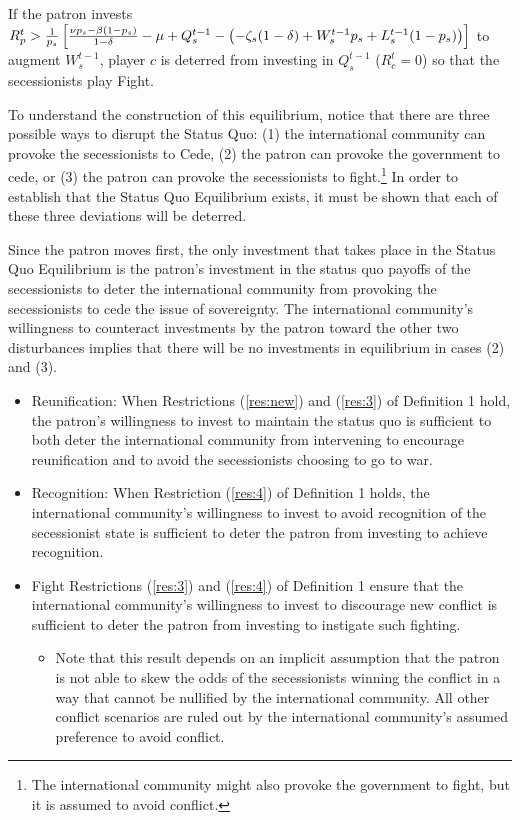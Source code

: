 \begin{definition}
\begin{enumerate}
If the patron invests $R_p^t > \frac{1}{p_s}\left[\frac{\nu p_s - \beta (1-p_s)}{1 -\delta} - \mu + Q_s^{t-1} - \left(-\zeta_{s}(1-\delta) + W_s^{t-1}p_s + L_s^{t-1}(1-p_s)\right)\right] $ to augment $W_s^{t-1}$, player $c$ is deterred from investing in $Q_s^{t-1}$ ($R_c^t=0$) so that the secessionists play Fight.
\end{enumerate}
\end{definition}

To understand the construction of this equilibrium, notice that there are three possible ways to disrupt the Status Quo: (1) the international community can provoke the secessionists to Cede, (2) the patron can provoke the government to cede, or (3) the patron can provoke the secessionists to fight.\footnote{The international community might also provoke the government to fight, but it is assumed to avoid conflict.} In order to establish that the Status Quo Equilibrium exists, it must be shown that each of these three deviations will be deterred.

Since the patron moves first, the only investment that takes place in the Status Quo Equilibrium is the patron's investment in the status quo payoffs of the secessionists to deter the international community from provoking the secessionists to cede the issue of sovereignty. The international community's willingness to counteract investments by the patron toward the other two disturbances implies that there will be no investments in equilibrium in cases (2) and (3).

\begin{itemize}
	\item Reunification: When Restrictions (\ref{res:new}) and (\ref{res:3}) of Definition 1 hold, the patron's willingness to invest to maintain the status quo is sufficient to both deter the international community from intervening to encourage reunification and to avoid the secessionists choosing to go to war.
	\item Recognition: When Restriction (\ref{res:4}) of Definition 1 holds, the international community's willingness to invest to avoid recognition of the secessionist state is sufficient to deter the patron from investing to achieve recognition.
	\item Fight Restrictions (\ref{res:3}) and (\ref{res:4}) of Definition 1 ensure that the international community's willingness to invest to discourage new conflict is sufficient to deter the patron from investing to instigate such fighting.
		\begin{itemize}
			\item Note that this result depends on an implicit assumption that the patron is not able to skew the odds of the secessionists winning the conflict in a way that cannot be nullified by the international community. All other conflict scenarios are ruled out by the international community's assumed preference to avoid conflict.
		\end{itemize}
\end{itemize}


